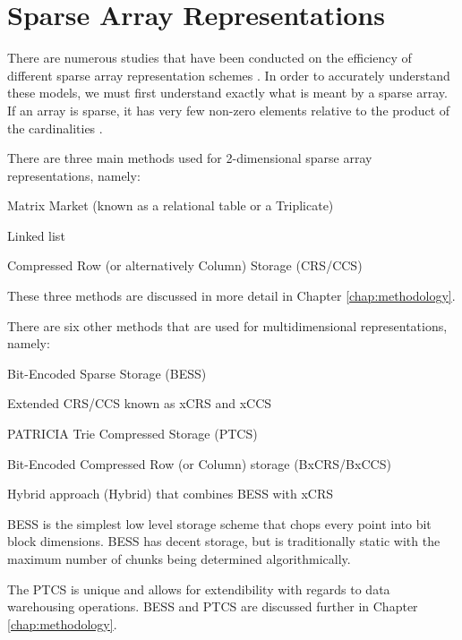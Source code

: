 \section{Sparse Array Representations}
There are numerous studies that have been conducted on the efficiency of different sparse array representation schemes \cite{wang:2014sar,goil:bess}. In order to accurately understand these models, we must first understand exactly what is meant by a sparse array. If an array is sparse, it has very few non-zero elements relative to the product of the cardinalities \cite{wang:2014sar}.

There are three main methods used for 2-dimensional sparse array representations, namely: 
\begin{compactenum}
	\item Matrix Market (known as a relational table or a Triplicate)
	\item Linked list
	\item Compressed Row (or alternatively Column) Storage (CRS/CCS)
\end{compactenum}	

These three methods are discussed in more detail in Chapter \ref{chap:methodology}.

There are six other methods that are used for multidimensional representations, namely: 
\begin{compactenum}
	\item Bit-Encoded Sparse Storage (BESS) 
	\item Extended CRS/CCS known as xCRS and xCCS
	\item PATRICIA Trie Compressed Storage (PTCS)
	\item Bit-Encoded Compressed Row (or Column) storage (BxCRS/BxCCS)
	\item Hybrid approach (Hybrid) that combines BESS with xCRS
\end{compactenum}

BESS is the simplest low level storage scheme that chops every point into bit block dimensions. BESS has decent storage, but is traditionally static with the maximum number of chunks being determined algorithmically.

The PTCS is unique and allows for extendibility with regards to data warehousing operations. BESS and PTCS are discussed further in Chapter \ref{chap:methodology}.



